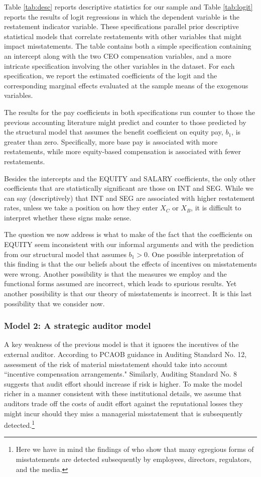\documentclass[12pt,reqno,titlepage]{amsart}
\theoremstyle{definition}
\begin{document}
\begin{doublespace}
Table \ref{tab:desc} reports descriptive statistics for our sample and Table \ref{tab:logit} reports the results of logit regressions in which the dependent variable is the restatement indicator variable.
These specifications parallel prior descriptive statistical models that correlate restatements with other variables that might impact misstatements.
The table contains both a simple specification containing an intercept along with the two CEO  compensation variables, and a more intricate specification involving the other variables in the dataset.
For each specification, we report the estimated coefficients of the logit and the corresponding marginal effects evaluated at the sample means of the exogenous variables.

The results for the pay coefficients in both specifications run counter to those the previous accounting literature might predict and counter to those predicted by the structural model that assumes the benefit coefficient on equity pay, $b_1$, is greater than zero.
Specifically, more base pay is associated with more restatements, while more equity-based 
compensation is associated with fewer restatements.

Besides the intercepts and the EQUITY and SALARY coefficients, the only other coefficients that are statistically significant are those on INT and SEG.
While we can say (descriptively) that INT and SEG are associated with higher restatement rates, unless we take a position on how they enter $X_C$ or $X_B$, it is difficult to interpret whether these signs make sense.

The question we now address is what to make of the fact that the coefficients on EQUITY seem inconsistent with our informal arguments and with the prediction from our structural model that assumes $b_1>0$.
One possible interpretation of this finding is that the our beliefs about the effects of  incentives on misstatements were wrong.
Another possibility is that the measures we employ and the functional forms assumed are incorrect, which leads to spurious results.
Yet another possibility is that our theory of misstatements is incorrect.
It is this last possibility that we consider now.

\subsubsection{Model 2: A strategic auditor model}
A key weakness of the previous model is that it ignores the incentives of the  external auditor.
According to PCAOB guidance in Auditing Standard No. 12, assessment of the risk of material misstatement should take into account ``incentive compensation arrangements."
Similarly, Auditing Standard No. 8 suggests that audit effort should increase if risk is higher.
To make the model richer in a manner consistent with these institutional details, we assume that auditors trade off the costs of audit effort against the reputational losses they might incur should they miss a managerial misstatement that is subsequently detected.\footnote{
Here we have in mind the findings of \citet{Dyck:2010kh} who show that many egregious forms of misstatements are detected subsequently by employees, directors, regulators, and the media.} 


\end{doublespace}
\end{document}
